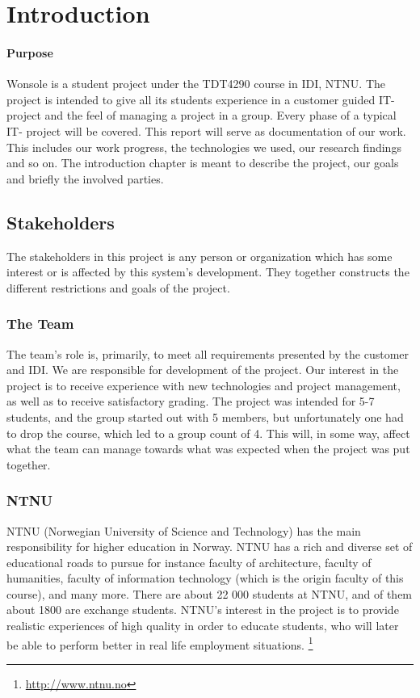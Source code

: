 \chapter{Introduction}

\minitoc

\subsubsection{Purpose}
Wonsole is a student project under the TDT4290 course in IDI, NTNU. The project is intended to give all its students experience in a customer guided IT- project and the feel of managing a project in a group. Every phase of a typical IT- project will be covered. This report will serve as documentation of our work. This includes our work progress, the technologies we used, our research findings and so on. The introduction chapter is meant to describe the project, our goals and briefly the involved parties.

\clearpage

\section{Stakeholders}

The stakeholders in this project is any person or organization which has some interest or is affected by this system's development. They together constructs the different restrictions and goals of the project.

\subsection{The Team}
The team's role is, primarily, to meet all requirements presented by the customer and IDI. We are responsible for development of the project. Our interest in the project is to receive experience with new technologies and project management, as well as to receive satisfactory grading.
The project was intended for 5-7 students, and the group started out with 5 members, but unfortunately one had to drop the course, which led to a group count of 4. This will, in some way, affect what the team can manage towards what was expected when the project was put together.

\subsection{NTNU}
\label{NTNU}
NTNU (Norwegian University of Science and Technology) has the main responsibility for higher education in Norway. NTNU has a rich and diverse set of educational roads to pursue for instance faculty of architecture, faculty of humanities, faculty of information technology (which is the origin faculty of this course), and many more. There are about 22 000 students at NTNU, and of them about 1800 are exchange students. NTNU’s interest in the project is to provide realistic experiences of high quality in order to educate students, who will later be able to perform better in real life employment situations.
\footnote{\url{http://www.ntnu.no}}

